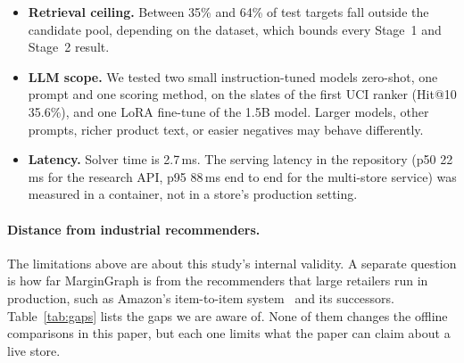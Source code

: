 \documentclass[11pt]{article}
\begin{document}
\begin{itemize}
\item \textbf{Retrieval ceiling.} Between 35\% and 64\% of test targets fall outside the candidate pool, depending on the dataset, which bounds every Stage~1 and Stage~2 result.
\item \textbf{LLM scope.} We tested two small instruction-tuned models zero-shot, one prompt and one scoring method, on the slates of the first UCI ranker (Hit@10 35.6\%), and one LoRA fine-tune of the 1.5B model. Larger models, other prompts, richer product text, or easier negatives may behave differently.
\item \textbf{Latency.} Solver time is 2.7\,ms. The serving latency in the repository (p50 22\,ms for the research API, p95 88\,ms end to end for the multi-store service) was measured in a container, not in a store's production setting.
\end{itemize}

\paragraph{Distance from industrial recommenders.}
The limitations above are about this study's internal validity.
A separate question is how far MarginGraph is from the recommenders that large retailers run in production, such as Amazon's item-to-item system~\citep{linden2003amazon} and its successors.
Table~\ref{tab:gaps} lists the gaps we are aware of.
None of them changes the offline comparisons in this paper, but each one limits what the paper can claim about a live store.
\end{document}
